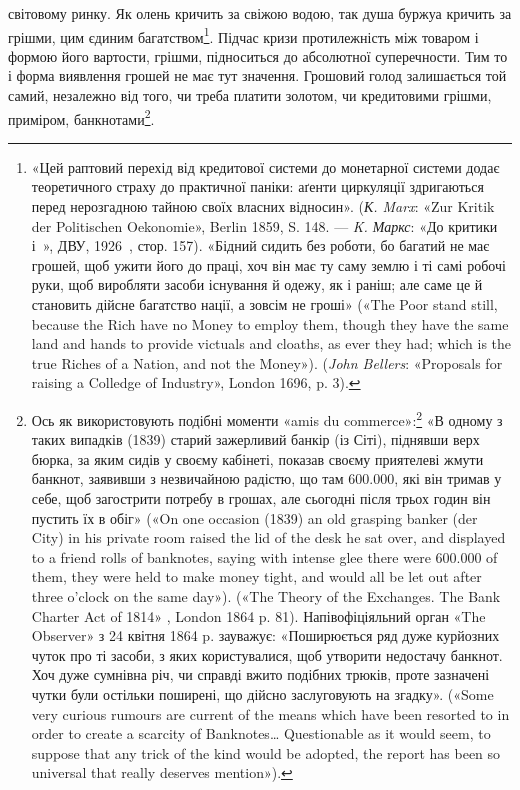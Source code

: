 \parcont{}  %
світовому ринку. Як олень кричить за свіжою водою, так душа буржуа кричить за грішми, цим єдиним
багатством\footnote{
«Цей раптовий перехід від кредитової системи до монетарної системи додає теоретичного страху до
практичної паніки: аґенти циркуляції здригаються перед нерозгадною тайною своїх власних відносин».
(\emph{К. Marx}: «Zur Kritik der Politischen Oekonomie», Berlin 1859, S. 148. — \emph{K. Маркс}: «До критики і~», ДВУ, 1926~, стор. 157). «Бідний сидить без роботи, бо багатий не має грошей, щоб ужити його
до праці, хоч він має ту саму землю і ті самі робочі руки, щоб виробляти засоби існування й одежу,
як і раніш; але саме це й становить дійсне багатство нації, а зовсім не гроші» («The Poor stand
still, because the Rich have no Money to employ them, though they have the same land and hands to
provide victuals and cloaths, as ever they had; which is the true Riches of a Nation, and not the
Money»). (\emph{John Bellers}: «Proposals for raising a Colledge of
Industry», London 1696, p. 3).
}. Підчас кризи протилежність між товаром і формою його вартости, грішми, підноситься до
абсолютної суперечности. Тим то і форма виявлення грошей не має тут значення. Грошовий голод
залишається той самий, незалежно від того, чи треба платити золотом, чи кредитовими грішми,
приміром, банкнотами\footnote{
Ось як використовують подібні моменти «amis du commerce»:\footnote*{
— друзі торговлі. \emph{Ред.}
} «В одному з таких випадків (1839)
старий зажерливий банкір (із Сіті), піднявши верх бюрка, за яким сидів у своєму кабінеті, показав
своєму приятелеві жмути банкнот, заявивши з незвичайною радістю, що там \num{600.000},
які він тримав у себе, щоб загострити потребу в грошах, але сьогодні після трьох годин він пустить
їх в обіг» («On one occasion (1839) an old grasping banker (der City) in his private room raised the
lid of the desk he sat over, and displayed to a friend rolls of banknotes, saying with intense glee
there were \num{600.000} of them, they were held to make money tight, and would all be let out after
three o'clock on the same day»). («The Theory of the Exchanges. The Bank Charter Act of 1814» ,
London 1864 p. 81). Напівофіціяльний орган «The Observer» з 24 квітня 1864 p. зауважує: «Поширюється
ряд дуже курйозних чуток про ті засоби, з яких користувалися, щоб утворити недостачу банкнот. Хоч
дуже сумнівна річ, чи справді вжито подібних трюків, проте зазначені чутки були остільки поширені,
що дійсно заслуговують на згадку». («Some very curious rumours are current of the means which have
been resorted to in order to create a scarcity of Banknotes\dots{} Questionable as it would seem, to
suppose that any trick of the kind would be adopted, the report has been so universal that really
deserves mention»).
}.

